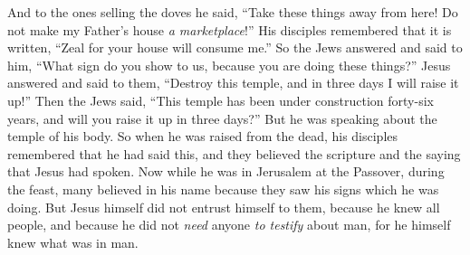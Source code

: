 \begin{biblechapter}
\verse And to the ones selling the doves he said, “Take these things away from here! Do not make my Father’s house \textit{a marketplace}!”
\verse His disciples remembered that it is written, “Zeal for your house will consume me.”
\verse So the Jews answered and said to him, “What sign do you show to us, because you are doing these things?”
\verse Jesus answered and said to them, “Destroy this temple, and in three days I will raise it up!”
\verse Then the Jews said, “This temple has been under construction forty-six years, and will you raise it up in three days?”
\verse But he was speaking about the temple of his body.
\verse So when he was raised from the dead, his disciples remembered that he had said this, and they believed the scripture and the saying that Jesus had spoken.
 Now while he was in Jerusalem at the Passover, during the feast, many believed in his name because they saw his signs which he was doing.
\verse But Jesus himself did not entrust himself to them, because he knew all people,
\verse and because he did not \textit{need} anyone \textit{to testify} about man, for he himself knew what was in man.
\end{biblechapter}

